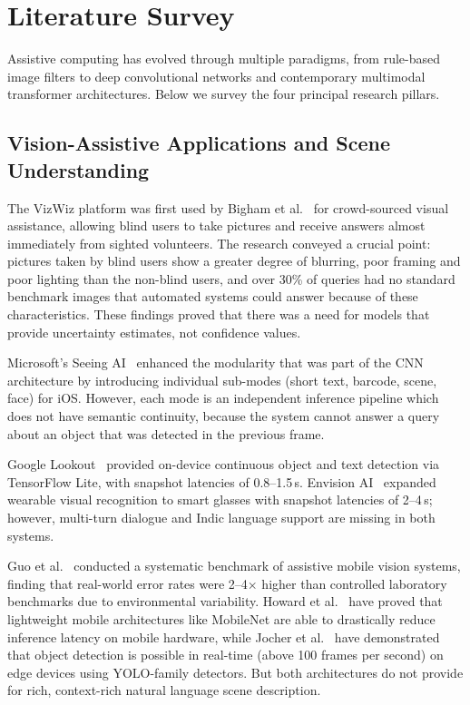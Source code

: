 \documentclass[pdflatex,sn-mathphys-num]{sn-jnl}
\theoremstyle{thmstyleone}%
\theoremstyle{thmstyletwo}%
\theoremstyle{thmstylethree}%
\begin{document}
\section{Literature Survey}\label{sec:litsurvey}

Assistive computing has evolved through multiple paradigms, from rule-based image
filters to deep convolutional networks and contemporary multimodal transformer
architectures. Below we survey the four principal research pillars.

\subsection{Vision-Assistive Applications and Scene Understanding}
The VizWiz platform was first used by Bigham et al.~\cite{bigham2010vizwiz} for
crowd-sourced visual assistance, allowing blind users to take pictures and receive
answers almost immediately from sighted volunteers. The research conveyed a crucial point: pictures taken
by blind users show a greater degree of blurring, poor framing and poor lighting than the non-blind users,
and over 30\% of queries had no standard benchmark images that automated
systems could answer because of these characteristics. These findings proved that there was a need
for models that provide uncertainty estimates, not confidence values.

Microsoft's Seeing AI~\cite{microsoftSeeingAI} enhanced the modularity that was part of the CNN architecture by
introducing individual sub-modes (short text, barcode, scene, face) for iOS. However,
each mode is an independent inference pipeline which does not have semantic continuity, because
the system cannot answer a query about an object that was detected in the previous frame.

Google Lookout~\cite{lookout2020} provided on-device continuous object and text detection
via TensorFlow Lite, with snapshot latencies of 0.8--1.5\,s. Envision
AI~\cite{envision2022} expanded wearable visual recognition to smart glasses with snapshot
latencies of 2--4\,s; however, multi-turn dialogue and Indic language support are missing
in both systems.

Guo et al.~\cite{guo2019visual} conducted a systematic benchmark of assistive mobile vision
systems, finding that real-world error rates were 2--4$\times$ higher than controlled
laboratory benchmarks due to environmental variability. Howard et al.~\cite{mobilenet2017} have proved that lightweight mobile architectures like MobileNet are able to drastically reduce inference latency on mobile hardware, while Jocher et al.~\cite{yolo2023} have demonstrated that object detection is possible in real-time (above 100 frames per second) on edge devices using YOLO-family detectors. But both architectures do not provide for rich, context-rich natural language scene description.
\end{document}
